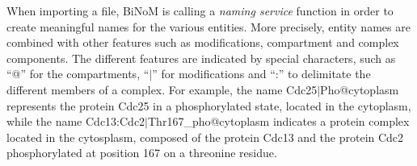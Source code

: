 \documentclass[10pt]{bmc_article}
\newenvironment{bmcformat}{\baselineskip20pt\sloppy\setboolean{publ}{false}}{\baselineskip20pt\sloppy}
\begin{document}
\begin{bmcformat}




When importing a file, BiNoM is calling a \emph{naming service} function in
order to create meaningful names for the various entities. More precisely,
entity names are combined with other features such as modifications, compartment
and complex components. The different features are indicated by special
characters, such as ``@'' for the compartments, ``$|$'' for modifications and
``:'' to delimitate the different members of a complex. For example, the
name Cdc25$|$Pho@cytoplasm represents the protein Cdc25 in a phosphorylated
state, located in the cytoplasm, while the name
Cdc13:Cdc2$|$Thr167\_pho@cytoplasm indicates a protein complex located in the
cytosplasm, composed of the protein Cdc13 and the protein Cdc2 phosphorylated at
position 167 on a threonine residue.



\end{bmcformat}
\end{document}
